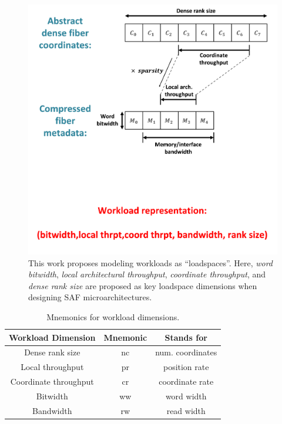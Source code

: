 \begin{itemize}
\begin{figure}[H]
    \centering
    \includegraphics[width=\linewidth]{figures/workload_representation.png}
    \caption{This work proposes modeling workloads as ``loadspaces''. Here, \textit{word bitwidth},  \textit{local architectural throughput}, \textit{coordinate throughput}, and \textit{dense rank size} are proposed as key loadspace dimensions when designing SAF microarchitectures.}
    \label{fig:workload_representation}
\end{figure}

    \begin{table}[h]
        \centering
        \caption{Mnemonics for workload dimensions.}
        \label{table:workload_dimension_mnemonics}
        \begin{tabular}{||c|c|c||}
            \hline \hline
            Workload Dimension & Mnemonic & Stands for \\
            \hline \hline
            Dense rank size & nc & num. coordinates \\
            \hline
            Local throughput & pr & position rate \\
            \hline
            Coordinate throughput & cr & coordinate rate \\
            \hline
            Bitwidth & ww & word width \\
            \hline
            Bandwidth & rw & read width \\
            \hline \hline
        \end{tabular}
    \end{table}


\end{itemize}
